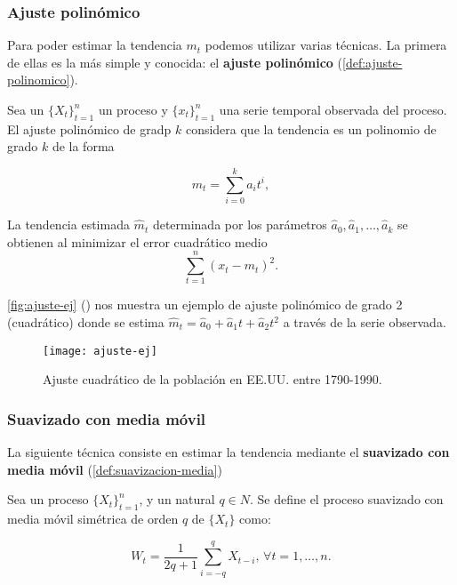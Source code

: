 \subsubsection{Ajuste polinómico}

Para poder estimar la tendencia $m_t$ podemos utilizar varias técnicas. La primera de ellas es la más simple y conocida: el \textbf{ajuste polinómico} (\autoref{def:ajuste-polinomico}).

\begin{definicion}
  Sea un $\{X_t\}_{t = 1}^n$ un proceso y $\{x_t\}_{t = 1}^n$ una serie temporal observada del proceso. El ajuste polinómico de gradp $k$ considera que la tendencia es un polinomio de grado $k$ de la forma

  $$m_t = \sum \limits^k_{i = 0} a_i t^i,$$

  La tendencia estimada $\hat{m}_t$ determinada por los parámetros $\hat{a}_0, \hat{a}_1, \ldots, \hat{a}_k$ se obtienen al minimizar el error cuadrático medio $$\sum \limits^n_{t = 1} (x_t - m_t)^2.$$
  \label{def:ajuste-polinomico}
\end{definicion}

\autoref{fig:ajuste-ej} (\cite{brockwell2002introduction}) nos muestra un ejemplo de ajuste polinómico de grado 2 (cuadrático) donde se estima $\hat{m}_t = \hat{a}_0 + \hat{a}_1 t + \hat{a}_2 t^2$ a través de la serie observada.

\begin{figure}[htpb]
  \centering
  \texttt{[image: ajuste-ej]}
  \caption{Ajuste cuadrático de la población en EE.UU. entre 1790-1990.}
  \label{fig:ajuste-ej}
\end{figure}

\subsubsection{Suavizado con media móvil}

La siguiente técnica consiste en estimar la tendencia mediante el \textbf{suavizado con media móvil} (\autoref{def:suavizacion-media})

\begin{definicion}
  Sea un proceso $\{X_t\}_{t = 1}^n$, y un natural $q \in N$. Se define el proceso suavizado con media móvil simétrica de orden $q$ de $\{X_t\}$ como:

  $$ W_t = \dfrac{1}{2q + 1} \sum \limits^q_{i = -q} X_{t - i}, \, \forall t = 1, \ldots, n.$$
  \label{def:suavizacion-media}
\end{definicion}

